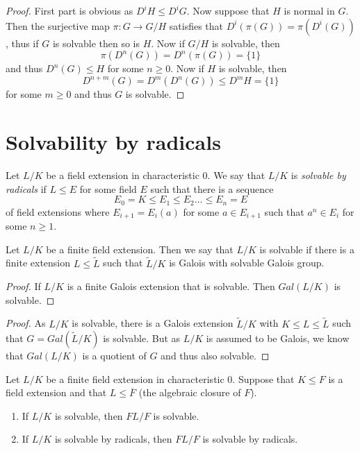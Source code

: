 \documentclass[twoside, a4paper, 10pt]{amsart}
\begin{document}
\begin{proof} First part is obvious as $D^iH \leq D^i G$. Now suppose that $H$ is normal in $G$. Then the surjective map $\pi:G \to G/H$ satisfies that $D^i(\pi(G)) =\pi(D^i(G))$, thus if $G$ is solvable then so is $H$. Now if $G/H$ is solvable, then $$\pi(D^n(G)) = D^n(\pi(G)) = \{1\}$$ and thus $D^n(G) \leq H$ for some $n \geq 0$. Now if $H$ is solvable, then $$D^{n+m}(G) =D^m(D^n(G)) \leq D^mH = \{1\}$$ for some $m \geq 0$ and thus $G$ is solvable. \end{proof}

\section{Solvability by radicals}

\begin{mydef} Let $L/K$ be a field extension in characteristic $0$. We say that $L/K$ is \textit{solvable by radicals} if $L \leq E$ for some field $E$ such that there is a sequence $$E_0 = K \leq E_{1} \leq E_2 \ldots \leq E_n = E$$ of field extensions where $E_{i+1} = E_i(a)$ for some $a \in E_{i+1}$ such that $a^n \in E_i$ for some $n \geq 1$.

\end{mydef}

\begin{mydef} Let $L/K$ be a finite field extension. Then we say that $L/K$ is solvable if there is a finite extension $L \leq \tilde{L}$ such that $\tilde{L}/K$ is Galois with solvable Galois group.

\end{mydef}

\begin{proof} If $L/K$ is a finite Galois extension that is solvable. Then $Gal(L/K)$ is solvable.

\end{proof}

\begin{proof} As $L/K$ is solvable, there is a Galois extension $\tilde{L}/K$ with $K \leq L \leq \tilde{L}$ such that $G = Gal(\tilde{L}/K)$ is solvable. But as $L/K$ is assumed to be Galois, we know that $Gal(L/K)$ is a quotient of $G$ and thus also solvable. \end{proof}

\begin{lemma} Let $L/K$ be a finite field extension in characteristic $0$. Suppose that $K \leq F$ is a field extension and that $L \leq \overline{F}$ (the algebraic closure of $F$). 

\begin{enumerate}
	\item If $L/K$ is solvable, then $FL/F$ is solvable.
	\item If $L/K$ is solvable by radicals, then $FL/F$ is solvable by radicals.
\end{enumerate}

\end{lemma}
\end{document}
